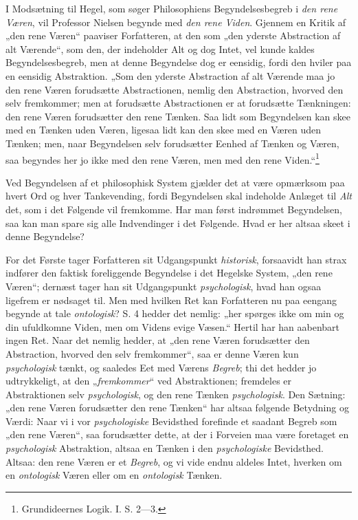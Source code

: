 \documentclass[12pt,a4paper]{book}
\newcommand{\opage}[1]{\marginnote{\footnotesize\textit{[#1]}}}
\begin{document}
I Modsætning til Hegel, som søger Philosophiens
Begyndelsesbegreb i \emph{den rene Væren}, vil Professor
Nielsen begynde med \emph{den rene Viden}. Gjennem en
Kritik af „den rene Væren“ paaviser Forfatteren, at den
som „den yderste Abstraction af alt Værende“, som
den, der indeholder Alt og dog Intet, vel kunde kaldes
Begyndelsesbegreb, men at denne Begyndelse dog er
eensidig, fordi den hviler paa en eensidig Abstraktion.
„Som den yderste Abstraction af alt Værende maa jo
den rene Væren forudsætte Abstractionen, nemlig den
Abstraction, hvorved den selv fremkommer; men at forudsætte
Abstractionen er at forudsætte Tænkningen: den
\opage{59}\setcounter{footnote}{0}%
rene Væren forudsætter den rene Tænken. Saa lidt
som Begyndelsen kan skee med en Tænken uden Væren,
ligesaa lidt kan den skee med en Væren uden Tænken; men,
naar Begyndelsen selv forudsætter Eenhed af Tænken og
Væren, saa begyndes her jo ikke med den rene Væren,
men med den rene Viden.“\footnote{Grundideernes Logik. I. S. 2---3.}

Ved Begyndelsen af et philosophisk System gjælder
det at være opmærksom paa hvert Ord og hver
Tankevending, fordi Begyndelsen skal indeholde Anlæget
til \emph{Alt} det, som i det Følgende vil fremkomme. Har
man først indrømmet Begyndelsen, saa kan man spare
sig alle Indvendinger i det Følgende. Hvad er her
altsaa skeet i denne Begyndelse?

For det Første tager Forfatteren sit Udgangspunkt
\emph{historisk}, forsaavidt han strax indfører den faktisk
foreliggende Begyndelse i det Hegelske System, „den
rene Væren“; dernæst tager han sit Udgangspunkt \emph{psychologisk},
hvad han ogsaa ligefrem er nødsaget til. Men
med hvilken Ret kan Forfatteren nu paa eengang begynde
at tale \emph{ontologisk}? S. 4 hedder det nemlig: „her
spørges ikke om min og din ufuldkomne Viden, men om
Videns evige Væsen.“ Hertil har han aabenbart ingen Ret.
Naar det nemlig hedder, at „den rene Væren forudsætter
den Abstraction, hvorved den selv fremkommer“, saa er
denne Væren kun \emph{psychologisk} tænkt, og saaledes Eet
med Værens \emph{Begreb}; thi det hedder jo udtrykkeligt,
at den „\emph{fremkommer}“ ved Abstraktionen; fremdeles er
Abstraktionen selv \emph{psychologisk}, og den rene Tænken
\opage{60}\setcounter{footnote}{0}%
\emph{psychologisk}. Den Sætning: „den rene Væren forudsætter
den rene Tænken“ har altsaa følgende Betydning
og Værdi: Naar vi i vor \emph{psychologiske} Bevidsthed
forefinde et saadant Begreb som „den rene
Væren“, saa forudsætter dette, at der i Forveien maa
være foretaget en \emph{psychologisk} Abstraktion, altsaa en
Tænken i den \emph{psychologiske} Bevidsthed. Altsaa:
den rene Væren er et \emph{Begreb}, og vi vide endnu aldeles
Intet, hverken om en \emph{ontologisk} Væren eller
om en \emph{ontologisk} Tænken.
\end{document}
